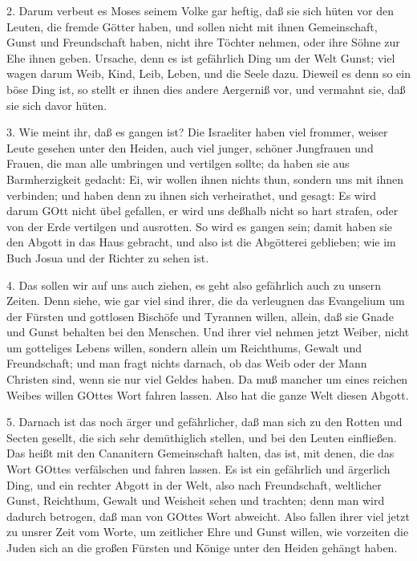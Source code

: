 2. Darum verbeut es Moses seinem Volke gar heftig, daß sie sich hüten vor den Leuten, die fremde Götter haben, und sollen nicht mit ihnen Gemeinschaft, Gunst und Freundschaft haben, nicht ihre Töchter nehmen, oder ihre Söhne zur Ehe ihnen geben. Ursache, denn es ist gefährlich Ding um der Welt Gunst; viel wagen darum Weib, Kind, Leib, Leben, und die Seele dazu. Dieweil es denn so ein böse Ding ist, so stellt er ihnen dies andere Aergerniß vor, und vermahnt sie, daß sie sich davor hüten.

3. Wie meint ihr, daß es gangen ist? Die Israeliter haben viel frommer, weiser Leute gesehen unter den Heiden, auch viel junger, schöner Jungfrauen und Frauen, die man alle umbringen und vertilgen sollte; da haben sie aus Barmherzigkeit gedacht: Ei, wir wollen ihnen nichts thun, sondern uns mit ihnen verbinden; und haben denn zu ihnen sich verheirathet, und gesagt: Es wird darum GOtt nicht übel gefallen, er wird uns deßhalb nicht so hart strafen, oder von der Erde vertilgen und ausrotten. So wird es gangen sein; damit haben sie den Abgott in das Haus gebracht, und also ist die Abgötterei geblieben; wie im Buch Josua und der Richter zu sehen ist.

4. Das sollen wir auf uns auch ziehen, es geht also gefährlich auch zu unsern Zeiten. Denn
siehe, wie gar viel sind ihrer, die da verleugnen das Evangelium um der Fürsten und gottlosen Bischöfe und Tyrannen willen, allein, daß sie Gnade und Gunst behalten bei den Menschen. Und ihrer viel nehmen jetzt Weiber, nicht um gotteliges Lebens willen, sondern allein um Reichthums, Gewalt und Freundschaft; und man fragt nichts darnach, ob das Weib oder der Mann Christen sind, wenn sie nur viel Geldes haben. Da muß mancher um eines reichen Weibes willen GOttes Wort fahren lassen. Also hat die ganze Welt diesen Abgott.

5. Darnach ist das noch ärger und gefährlicher, daß man sich zu den Rotten und Secten gesellt, die sich sehr demüthiglich stellen, und bei den Leuten einfließen. Das heißt mit den Cananitern Gemeinschaft halten, das ist, mit denen, die das Wort GOttes verfälschen und fahren lassen. Es ist ein gefährlich und ärgerlich Ding, und ein rechter Abgott in der Welt, also nach Freundschaft, weltlicher Gunst, Reichthum, Gewalt und Weisheit sehen und trachten; denn man wird dadurch betrogen, daß man von GOttes Wort abweicht. Also fallen ihrer viel jetzt zu unsrer Zeit vom Worte, um zeitlicher Ehre und Gunst willen, wie vorzeiten die Juden sich an die großen Fürsten und Könige unter den Heiden gehängt haben.

